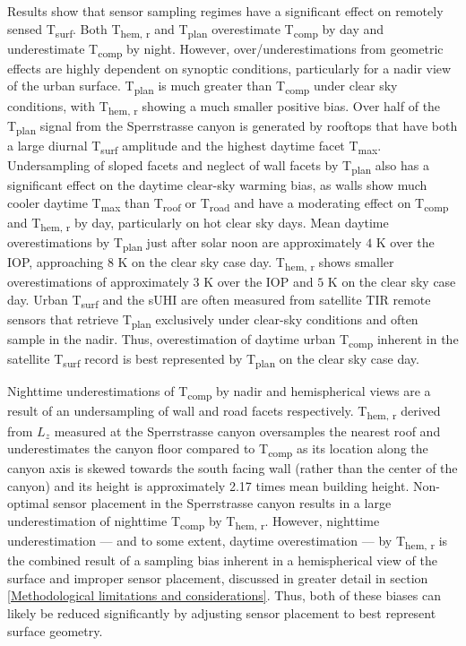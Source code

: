 \begin{bibunit}
Results show that sensor sampling regimes have a significant effect on remotely sensed T\textsubscript{surf}. Both T\textsubscript{hem, r} and T\textsubscript{plan} overestimate T\textsubscript{comp} by day and underestimate T\textsubscript{comp} by night. However, over/underestimations from geometric effects are highly dependent on synoptic conditions, particularly for a nadir view of the urban surface. T\textsubscript{plan} is much greater than T\textsubscript{comp} under clear sky conditions, with T\textsubscript{hem, r} showing a much smaller positive bias. Over half of the T\textsubscript{plan} signal from the Sperrstrasse canyon is generated by rooftops that have both a large diurnal T\textsubscript{surf} amplitude and the highest daytime facet T\textsubscript{max}. Undersampling of sloped facets and neglect of wall facets by T\textsubscript{plan} also has a significant effect on the daytime clear-sky warming bias, as walls show much cooler daytime T\textsubscript{max} than T\textsubscript{roof} or T\textsubscript{road} and have a moderating effect on T\textsubscript{comp} and T\textsubscript{hem, r} by day, particularly on hot clear sky days. Mean daytime overestimations by T\textsubscript{plan} just after solar noon are approximately $4$ \si{K} over the IOP, approaching $8$ \si{K} on the clear sky case day. T\textsubscript{hem, r} shows smaller overestimations of approximately $3$ \si{K} over the IOP and $5$ \si{K} on the clear sky case day. Urban T\textsubscript{surf} and the sUHI are often measured from satellite TIR remote sensors that retrieve T\textsubscript{plan} exclusively under clear-sky conditions and often sample in the nadir. Thus, overestimation of daytime urban T\textsubscript{comp} inherent in the satellite T\textsubscript{surf} record is best represented by T\textsubscript{plan} on the clear sky case day. 

Nighttime underestimations of T\textsubscript{comp} by nadir and hemispherical views are a result of an undersampling of wall and road facets respectively. T\textsubscript{hem, r} derived from $L_z$ measured at the Sperrstrasse canyon oversamples the nearest roof and underestimates the canyon floor compared to T\textsubscript{comp} as its location along the canyon axis is skewed towards the south facing wall (rather than the center of the canyon) and its height is approximately 2.17 times mean building height. Non-optimal sensor placement in the Sperrstrasse canyon results in a large underestimation of nighttime T\textsubscript{comp} by T\textsubscript{hem, r}. However, nighttime underestimation --- and to some extent, daytime overestimation --- by T\textsubscript{hem, r} is the combined result of a sampling bias inherent in a hemispherical view of the surface and improper sensor placement, discussed in greater detail in section \ref{Methodological limitations and considerations}. Thus, both of these biases can likely be reduced significantly by adjusting sensor placement to best represent surface geometry. 


\end{bibunit}
